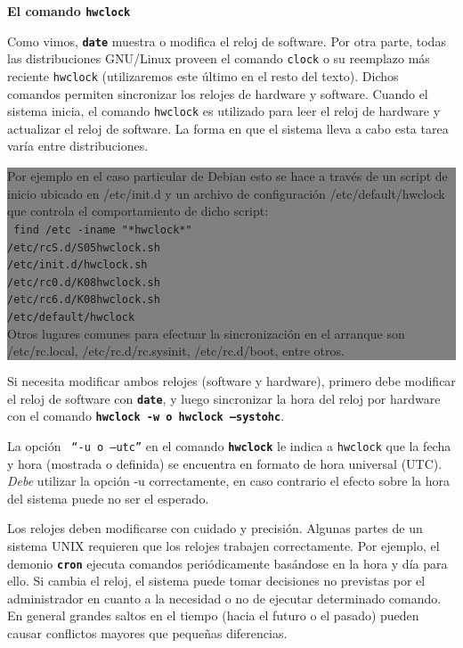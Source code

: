 \documentclass[12pt]{article}
\begin{document}
\textbf{El comando \texttt{hwclock}}

Como vimos, \texttt{\textbf{date}} muestra o modifica el reloj de software. 
Por otra parte, todas las distribuciones GNU/Linux proveen el comando \texttt{clock} o su reemplazo más
reciente \texttt{hwclock} (utilizaremos este último en el resto del texto). Dichos comandos permiten 
sincronizar los relojes de hardware y software. Cuando el sistema inicia, el comando \texttt{hwclock}
 es utilizado para leer el reloj de hardware y actualizar el reloj de software. La forma en que el 
sistema lleva a cabo esta tarea varía entre distribuciones. 

\colorbox{grey}{\parbox[t]{0.95\linewidth}{ \vspace*{0.5cm}
Por ejemplo en el caso particular de Debian esto se hace a través de un script de inicio ubicado 
en /etc/init.d y un archivo de configuración /etc/default/hwclock que controla el comportamiento 
de dicho script: \\
{\tt
find /etc -iname "*hwclock*"\\
/etc/rcS.d/S05hwclock.sh\\
/etc/init.d/hwclock.sh\\
/etc/rc0.d/K08hwclock.sh\\
/etc/rc6.d/K08hwclock.sh\\
/etc/default/hwclock\\
}
Otros lugares comunes para efectuar la sincronización en el arranque son /etc/rc.local, 
/etc/rc.d/rc.sysinit, /etc/rc.d/boot, entre otros. 
} \vspace*{0.5cm} }  

Si necesita modificar ambos relojes (software y hardware), primero debe modificar el 
reloj de software con \texttt{\textbf{date}}, y luego sincronizar la hora del reloj 
por hardware con el comando \texttt{\textbf{hwclock -w o hwclock --systohc}}.

La opción \texttt{ ``-u o --utc''} en el comando \texttt{\textbf{hwclock}} le indica 
a \texttt{hwclock} que la fecha y hora (mostrada o definida)
se encuentra en formato de hora universal (UTC). \textit{Debe} utilizar la opción -u correctamente, en
caso contrario el efecto sobre la hora del sistema puede no ser el esperado. 


Los relojes deben modificarse con cuidado y precisión.
Algunas partes de un sistema UNIX requieren que los relojes trabajen correctamente.
Por ejemplo, el demonio \texttt{\textbf{cron}} ejecuta comandos periódicamente basándose en la
hora y día para ello. Si cambia el reloj, el sistema puede tomar decisiones no previstas por 
el administrador en cuanto a la necesidad o no de ejecutar determinado comando.
En general grandes saltos en el tiempo (hacia el futuro o el pasado) pueden causar conflictos mayores
que pequeñas diferencias.
\end{document}
